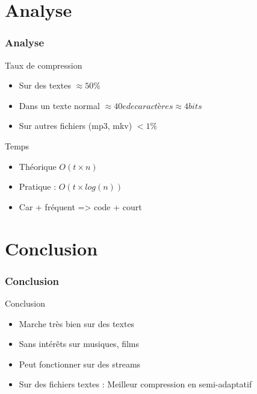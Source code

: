 \documentclass[12pt,francais]{beamer}
\begin{document}
\section{Analyse}
\begin{frame}
  \frametitle{Analyse}
  \begin{block}{Taux de compression}
    \begin{itemize}
      \item Sur des textes $\approx 50\%$
      \item Dans un texte normal $\approx 40e de caractères \approx 4 bits$
       \item Sur autres fichiers (mp3, mkv) $< 1\%$
    \end{itemize}
  \end{block}
  \begin{block}{Temps}
    \begin{itemize}
      \item Théorique $O(t\times n)$
      \item Pratique : $O(t \times log(n))$
      \item Car + fréquent => code + court
    \end{itemize}
  \end{block}
\end{frame}

\section{Conclusion}
\begin{frame}
  \frametitle{Conclusion}
  \begin{block}{Conclusion}
    \begin{itemize}
      \item Marche très bien sur des textes
      \item Sans intérêts sur musiques, films
       \item Peut fonctionner sur des streams
       \item Sur des fichiers textes : Meilleur compression en semi-adaptatif
    \end{itemize}
  \end{block}
\end{frame}
\end{document}
